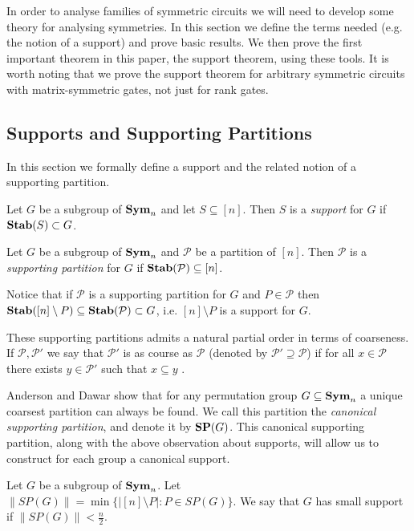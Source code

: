 \documentclass[../paper.tex]{subfiles}
\begin{document}
In order to analyse families of symmetric circuits we will need to develop some
theory for analysing symmetries. In this section we define the terms needed
(e.g. the notion of a support) and prove basic results. We then prove the first
important theorem in this paper, the support theorem, using these tools. It is
worth noting that we prove the support theorem for arbitrary symmetric circuits
with matrix-symmetric gates, not just for rank gates.

\subsection{Supports and Supporting Partitions}
In this section we formally define a support and the related notion of a
supporting partition.

\begin{definition}
  Let $G$ be a subgroup of $\text{\textbf{Sym}}_n$ and let $S \subseteq [n]$. Then $S$ is a
  \emph{support} for $G$ if $\text{\textbf{Stab}}(S) \subset G$.
\end{definition}

\begin{definition}
  Let $G$ be a subgroup of $\text{\textbf{Sym}}_n$ and $\mathcal{P}$ be a partition of $[n]$.
  Then $\mathcal{P}$ is a \emph{supporting partition} for $G$ if
  $\text{\textbf{Stab}}(\mathcal{P}) \subseteq [n]$.
\end{definition}

Notice that if $\mathcal{P}$ is a supporting partition for $G$ and $P \in
\mathcal{P}$ then $\text{\textbf{Stab}}([n] \setminus P) \subseteq \text{\textbf{Stab}}(\mathcal{P}) \subset
G$, i.e. $[n] \setminus P$ is a support for $G$.

These supporting partitions admits a natural partial order in terms of
coarseness. If $\mathcal{P}, \mathcal{P}'$ we say that $\mathcal{P}'$ is as
course as $\mathcal{P}$ (denoted by $\mathcal{P}' \supseteq \mathcal{P}$) if for
all $x \in \mathcal{P}$ there exists $y \in \mathcal{P}'$ such that $x \subseteq
y$ \cite{AndersonD17}.

Anderson and Dawar \cite{AndersonD17} show that for any permutation group $G
\subseteq \text{\textbf{Sym}}_n$ a unique coarsest partition can always be found. We call this
partition the \emph{canonical supporting partition}, and denote it by $\text{\textbf{SP}} (G)$.
This canonical supporting partition, along with the above observation about
supports, will allow us to construct for each group a canonical support.

\begin{definition}
  Let $G$ be a subgroup of $\text{\textbf{Sym}}_n$. Let $\| SP(G) \| = \min \{\vert [n]
  \setminus P \vert : P \in SP(G) \}$. We say that $G$ has small support if $\|
  SP(G) \| < \frac{n}{2}$.
\end{definition}
\end{document}
